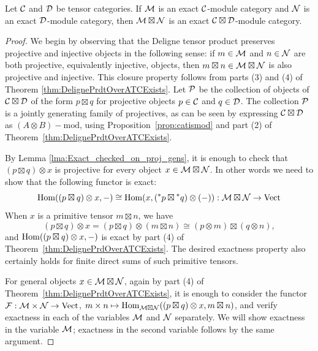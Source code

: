 \documentclass{amsart}
\begin{document}
\begin{theorem}\label{thm:tensor-exactness}
Let $\mathcal C$ and $\mathcal D$ be tensor categories.  If $\mathcal M$ is an exact $\mathcal C$-module category and $\mathcal N$ is an exact $\mathcal D$-module category, then $\mathcal M \boxtimes \mathcal N$ is an exact $\mathcal C \boxtimes \mathcal D$-module category.
\end{theorem} %
\begin{proof}
We begin by observing that the Deligne tensor product preserves projective and injective objects in the following sense: if $m \in \mathcal M$ and $n \in \mathcal N$ are both projective, equivalently injective, objects, then $m \boxtimes n \in \mathcal M \boxtimes \mathcal N$ is also projective and injective. This closure property follows from parts (3) and (4) of Theorem \ref{thm:DelignePrdtOverATCExists}. Let $\mathcal P$ be the collection of objects of $\mathcal C \boxtimes \mathcal D$ of the form $p \boxtimes q$ for projective objects $p \in \mathcal C$ and $q \in \mathcal D$. The collection $\mathcal P$ is a jointly generating family of projectives, as can be seen by expressing $\mathcal C \boxtimes \mathcal D$ as $(A \otimes B)-\mathrm{mod}$, using Proposition~\ref{prop:catismod} and part (2) of Theorem~\ref{thm:DelignePrdtOverATCExists}. 

By Lemma \ref{lma:Exact_checked_on_proj_gens}, it is enough to check that $(p \boxtimes q) \otimes x$ is projective for every object $x \in \mathcal M \boxtimes \mathcal N$. In other words we need to show that the following functor is exact:
\begin{equation*}
	\operatorname{Hom}((p \boxtimes q) \otimes x, -) \cong \operatorname{Hom}(x, ({}^*p \boxtimes {}^*q) \otimes(-) ): \mathcal M \boxtimes \mathcal N \to \mathrm{Vect}
\end{equation*}
When $x$ is a primitive tensor $m \boxtimes n$, we have
\begin{equation*}
	(p \boxtimes q) \otimes x = (p \boxtimes q) \otimes (m \boxtimes n) \cong (p \otimes m) \boxtimes (q \otimes n),
\end{equation*}
and $\operatorname{Hom}((p \boxtimes q) \otimes x,-)$ is exact by part (4) of Theorem~\ref{thm:DelignePrdOverATCExists}.
The desired exactness property also certainly holds for finite direct sums of such primitive tensors. 

For general objects $x \in \mathcal M \boxtimes \mathcal N$, again by part (4) of Theorem~\ref{thm:DelignePrdtOverATCExists}, it is enough to consider the functor $\mathcal F: \mathcal M \times \mathcal N \rightarrow \mathrm{Vect}$, $m \times n \mapsto \operatorname{Hom}_{\mathcal M \boxtimes \mathcal N}((p \boxtimes q) \otimes x, m \boxtimes n)$, and verify exactness in each of the variables $\mathcal M$ and $\mathcal N$ separately. We will show exactness in the variable $\mathcal M$; exactness in the second variable follows by the same argument. 


\end{proof}
\end{document}
